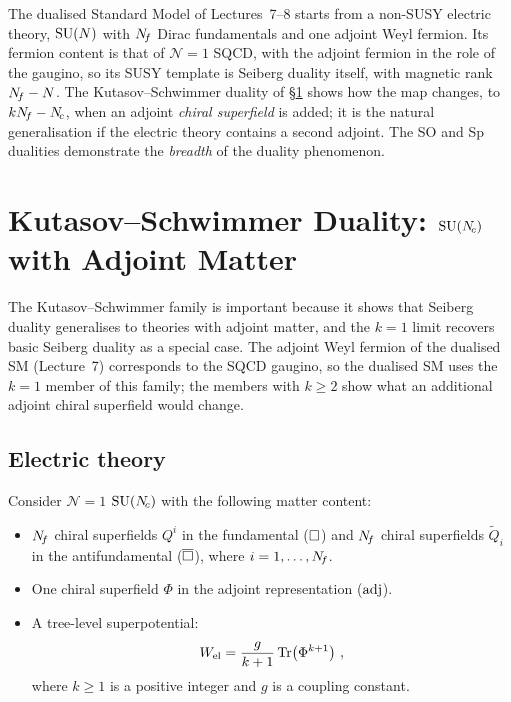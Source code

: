 \documentclass[11pt,a4paper]{article}
\begin{document}
\begin{previewbox}[title={Connection to the dualised SM}]
The dualised Standard Model of Lectures~7--8 starts from a non-SUSY
electric theory, $\mathrm{SU}(N)$ with $N_{\!f}$ Dirac fundamentals and one adjoint
Weyl fermion.  Its fermion content is that of $\mathcal{N}=1$ SQCD, with
the adjoint fermion in the role of the gaugino, so its SUSY template is
Seiberg duality itself, with magnetic rank $N_{\!f} - N$.  The
Kutasov--Schwimmer duality of \S\ref{sec:kutasov-schwimmer} shows how
the map changes, to $kN_{\!f} - N_{\!c}$, when an adjoint \emph{chiral
superfield} is added; it is the natural generalisation if the electric
theory contains a second adjoint.  The SO and Sp dualities demonstrate
the \emph{breadth} of the duality phenomenon.
\end{previewbox}


\section{Kutasov--Schwimmer Duality: $\mathrm{SU}(N_{\!c})$ with Adjoint Matter}
\label{sec:kutasov-schwimmer}

The Kutasov--Schwimmer family is important because it shows that Seiberg
duality generalises to theories with adjoint matter, and the $k=1$ limit
recovers basic Seiberg duality as a special case.  The adjoint Weyl
fermion of the dualised SM (Lecture~7) corresponds to the SQCD gaugino,
so the dualised SM uses the $k = 1$ member of this family; the members
with $k \geq 2$ show what an additional adjoint chiral superfield would
change.

\subsection{Electric theory}

Consider $\mathcal{N}=1$ $\mathrm{SU}(N_{\!c})$ with the following matter content:
\begin{itemize}
  \item $N_{\!f}$ chiral superfields $Q^i$ in the fundamental ($\square$)
    and $N_{\!f}$ chiral superfields $\widetilde{Q}_i$ in the
    antifundamental ($\overline{\square}$), where $i = 1, \ldots, N_{\!f}$.
  \item One chiral superfield $\Phi$ in the adjoint representation
    ($\mathrm{adj}$).
  \item A tree-level superpotential:
    \begin{equation}\label{eq:KS-W-el}
      W_{\text{el}} = \frac{g}{k+1}\,\mathrm{Tr}\!\left(\Phi^{k+1}\right)\,,
    \end{equation}
    where $k \geq 1$ is a positive integer and $g$ is a coupling
    constant.
\end{itemize}
\end{document}

